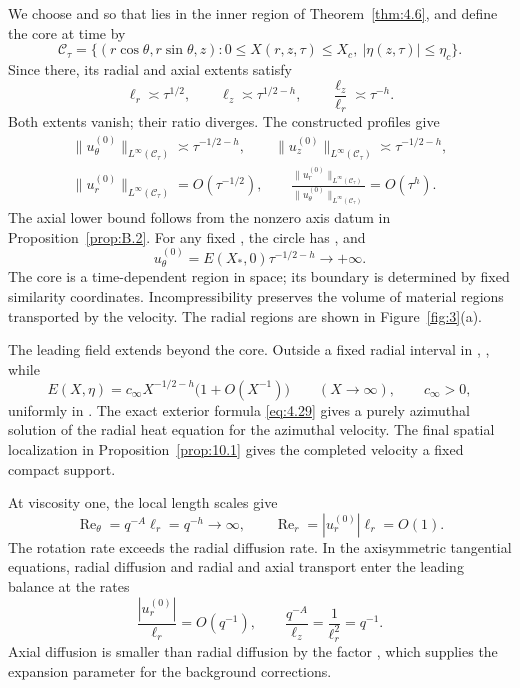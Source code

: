 We choose  and  so that
 lies in the inner region of
Theorem~\ref{thm:4.6}, and define the core at time  by
\[
 \mathcal C_\tau=\{(r\cos\theta,r\sin\theta,z):0\leq X(r,z,\tau)\leq X_c,
 \ |\eta(z,\tau)|\leq\eta_c\}.
\]
Since  there, its radial and axial extents satisfy
\[
 \ell_r\asymp\tau^{1/2},\qquad
 \ell_z\asymp\tau^{1/2-h},\qquad
 \frac{\ell_z}{\ell_r}\asymp\tau^{-h}.
\]
Both extents vanish; their ratio diverges. The constructed profiles give
\[
 \begin{gathered}
  \|u_\theta^{(0)}\|_{L^\infty(\mathcal C_\tau)}\asymp\tau^{-1/2-h},
  \qquad
  \|u_z^{(0)}\|_{L^\infty(\mathcal C_\tau)}\asymp\tau^{-1/2-h},\\
  \|u_r^{(0)}\|_{L^\infty(\mathcal C_\tau)}=O(\tau^{-1/2}),
  \qquad
  \frac{\|u_r^{(0)}\|_{L^\infty(\mathcal C_\tau)}}
       {\|u_\theta^{(0)}\|_{L^\infty(\mathcal C_\tau)}}=O(\tau^h).
 \end{gathered}
\]
The axial lower bound follows from the nonzero axis datum in Proposition~\ref{prop:B.2}.
For any fixed , the circle
 has
, and
\[
 u_\theta^{(0)}=E(X_*,0)\tau^{-1/2-h}\longrightarrow+\infty.
\]
The core is a time-dependent region in space; its boundary is determined by fixed similarity
coordinates. Incompressibility preserves the volume of material regions transported by the
velocity. The radial regions are shown in Figure~\ref{fig:3}(a).

The leading field extends beyond the core. Outside a fixed radial interval in
, , while
\[
 E(X,\eta)=c_\infty X^{-1/2-h}\bigl(1+O(X^{-1})\bigr)
 \qquad (X\to\infty),\qquad c_\infty>0,
\]
uniformly in . The exact exterior formula \eqref{eq:4.29} gives a purely
azimuthal solution of the radial heat equation for the azimuthal velocity. The final spatial
localization in Proposition~\ref{prop:10.1} gives the completed velocity a fixed compact support.

At viscosity one, the local length scales
 give
\[
 \operatorname{Re}_\theta=q^{-A}\ell_r=q^{-h}\longrightarrow\infty,
 \qquad
 \operatorname{Re}_r=|u_r^{(0)}|\ell_r=O(1).
\]
The rotation rate exceeds the radial diffusion rate. In the axisymmetric tangential equations,
radial diffusion and radial and axial transport enter the leading balance at the rates
\[
 \frac{|u_r^{(0)}|}{\ell_r}=O(q^{-1}),
 \qquad
 \frac{q^{-A}}{\ell_z}=\frac1{\ell_r^2}=q^{-1}.
\]
Axial diffusion is smaller than radial diffusion by the factor
, which supplies the expansion parameter for the
background corrections.


